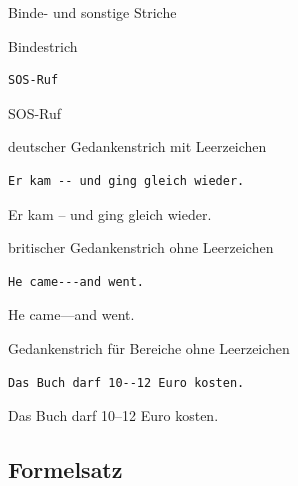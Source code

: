 \begin{Frame}[fragile]{Binde- und sonstige Striche}
  \begin{looseitemize}
    \item Bindestrich
      \begin{lstlisting}[gobble=8]
        SOS-Ruf
      \end{lstlisting}
      SOS-Ruf
    \item deutscher Gedankenstrich mit Leerzeichen
      \begin{lstlisting}[gobble=8]
        Er kam -- und ging gleich wieder.
      \end{lstlisting}
      Er kam -- und ging gleich wieder.
    \item britischer Gedankenstrich ohne Leerzeichen
      \begin{lstlisting}[gobble=8]
        He came---and went.
      \end{lstlisting}
      He came---and went.
    \item Gedankenstrich für Bereiche ohne Leerzeichen
      \begin{lstlisting}[gobble=8]
        Das Buch darf 10--12 Euro kosten.
      \end{lstlisting}
      Das Buch darf 10--12 Euro kosten.
  \end{looseitemize}
\end{Frame}

\subsection{Formelsatz}


